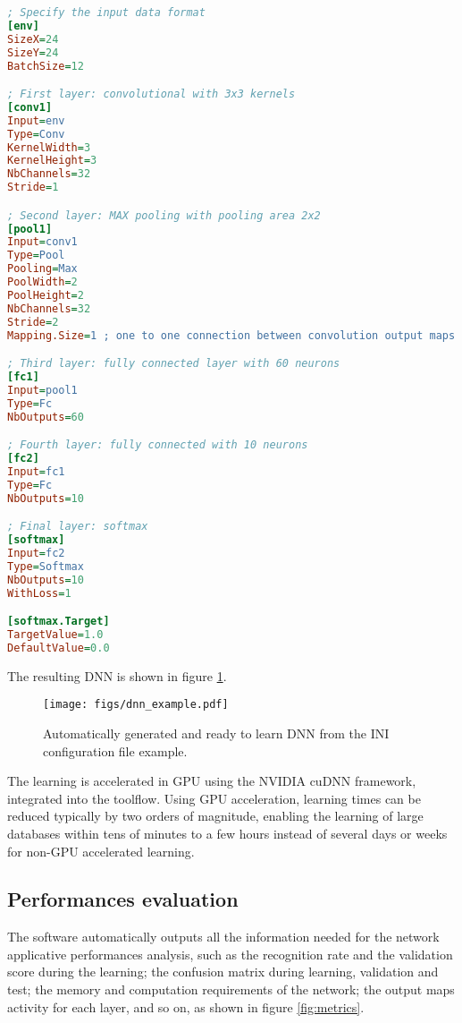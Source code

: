 \documentclass[a4paper,11pt,oneside]{article}
\begin{document}
\begin{lstlisting}[language=ini]
; Specify the input data format
[env]
SizeX=24
SizeY=24
BatchSize=12

; First layer: convolutional with 3x3 kernels
[conv1]
Input=env
Type=Conv
KernelWidth=3
KernelHeight=3
NbChannels=32
Stride=1

; Second layer: MAX pooling with pooling area 2x2
[pool1]
Input=conv1
Type=Pool
Pooling=Max
PoolWidth=2
PoolHeight=2
NbChannels=32
Stride=2
Mapping.Size=1 ; one to one connection between convolution output maps and pooling input maps

; Third layer: fully connected layer with 60 neurons
[fc1]
Input=pool1
Type=Fc
NbOutputs=60

; Fourth layer: fully connected with 10 neurons
[fc2]
Input=fc1
Type=Fc
NbOutputs=10

; Final layer: softmax
[softmax]
Input=fc2
Type=Softmax
NbOutputs=10
WithLoss=1

[softmax.Target]
TargetValue=1.0
DefaultValue=0.0
\end{lstlisting}

The resulting DNN is shown in figure \ref{fig:DNNExample}.

\begin{figure}[!htb]
  \centering
  \texttt{[image: figs/dnn\_example.pdf]}
  \caption{Automatically generated and ready to learn DNN from the INI
  configuration file example.}
  \label{fig:DNNExample}
\end{figure}

The learning is accelerated in GPU using the NVIDIA\textregistered{} cuDNN
framework, integrated into the toolflow. Using GPU acceleration, learning times
 can be reduced typically by two orders of magnitude, enabling the learning of
  large databases within tens of minutes to a few hours instead of several days
   or weeks for non-GPU accelerated learning.


\subsection{Performances evaluation}

The software automatically outputs all the information needed for the network
 applicative performances analysis, such as the recognition rate and the
 validation score during the learning; the confusion matrix during learning,
  validation and test; the memory and computation requirements of the network;
  the output maps activity for each layer, and so on, as shown in figure
   \ref{fig:metrics}.
\end{document}
